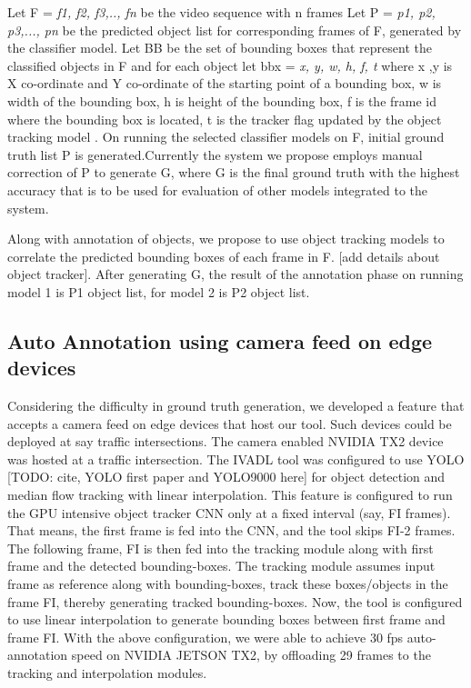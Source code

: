 \documentclass[conference]{IEEEtran}
\begin{document}
Let F = \textit{ f1, f2, f3,.., fn}  be the video sequence with n frames Let P =  \textit{p1, p2, p3,..., pn}  be the predicted  object list for corresponding frames of F, generated by the classifier model. Let BB be the set of bounding boxes that represent the classified objects in F and  for each object let bbx =  \textit{x, y, w, h, f, t} where  x ,y is  X co-ordinate and Y co-ordinate of the starting point of a bounding box, w is width of the bounding box, h is height of the bounding  box, f is the frame id where the bounding box is located, t is the tracker flag updated by the object tracking model . On running the selected classifier models on F, initial ground truth list P is generated.Currently the system we propose employs manual correction of P to generate G, where G is the final ground truth with the highest accuracy that is to be used for evaluation of other models integrated to the system. \par

Along with annotation of objects, we propose to use object tracking models to correlate the predicted bounding boxes of each frame in F. [add details about object tracker]. After generating G, the result of the annotation phase on running model 1 is P1 object list, for model 2 is P2 object list.

\subsection{Auto Annotation using camera feed on edge devices}
Considering the difficulty in ground truth generation, we developed a feature that accepts a camera feed on edge devices that host our tool. 
Such devices could be deployed at say traffic intersections. The camera enabled NVIDIA TX2 device was hosted at a traffic intersection. 
The IVADL tool was configured to use YOLO [TODO: cite, YOLO first paper and YOLO9000 here] for object detection and median flow tracking with linear interpolation. 
This feature is configured to run the GPU intensive object tracker CNN only at a fixed interval (say, {FI} frames). 
That means, the first frame is fed into the CNN, and the tool skips {FI-2} frames. 
The following frame, {FI} is then fed into the tracking module along with first frame and the detected bounding-boxes. 
The tracking module assumes input frame as reference along with bounding-boxes, track these boxes/objects in the frame {FI}, thereby generating tracked bounding-boxes.
Now, the tool is configured to use linear interpolation to generate bounding boxes between first frame and frame {FI}.
With the above configuration, we were able to achieve 30 fps auto-annotation speed on NVIDIA JETSON TX2, by offloading 29 frames to the tracking and interpolation modules.  
\end{document}
